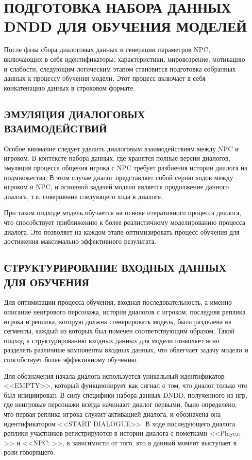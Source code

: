 \section{ПОДГОТОВКА НАБОРА ДАННЫХ DNDD ДЛЯ ОБУЧЕНИЯ МОДЕЛЕЙ}

После фазы сбора диалоговых данных и генерации параметров NPC, включающих в себя идентификаторы, характеристики, мировозрение, мотивацию и слабости, следующим логическим этапом становится подготовка собранных данных к процессу обучения модели. Этот процесс включает в себя конкатенацию данных в строковом формате.

\subsection{ЭМУЛЯЦИЯ ДИАЛОГОВЫХ ВЗАИМОДЕЙСТВИЙ}

Особое внимание следует уделить диалоговым взаимодействиям между NPC и игроком. В контексте набора данных, где хранятся полные версии диалогов, эмуляция процесса общения игрока с NPC требует разбиения истории диалога на подмножества. В этом случае диалог представляет собой серию ходов между игроком и NPC, и основной задачей модели является продолжение данного диалога, т.е. совершение следующего хода в диалоге.

При таком подходе модель обучается на основе итеративного процесса диалога, что способствует приближению к более реалистичному моделированию процесса диалога. Это позволяет на каждом этапе оптимизировать процесс обучения для достижения максимально эффективного результата.

\subsection{СТРУКТУРИРОВАНИЕ ВХОДНЫХ ДАННЫХ ДЛЯ ОБУЧЕНИЯ}

Для оптимизации процесса обучения, входная последовательность, а именно описание неигрового персонажа, история диалогов с игроком, последняя реплика игрока и реплика, которую должна сгенерировать модель, была разделена на сегменты, каждый из которых был помечен соответствующим образом. Такой подход к структурированию входных данных для модели позволяет ясно разделять различные компоненты входных данных, что облегчает задачу модели и способствует более эффективному обучению.

Для обозначения начала диалога используется уникальный идентификатор <<EMPTY>>, который функционирует как сигнал о том, что диалог только что был инициирован. В силу специфики набора данных DNDD, полученного из игр, где неигровые персонажи всегда начинают диалог первыми, было определено, что первая реплика игрока служит активацией диалога, и обозначена она идентификатором <<START DIALOGUE>>. В ходе последующего диалога реплики участников регистрируются в истории диалога с пометками <<Player: >> и <<NPC: >>, в зависимости от того, кто в данный момент выступает в роли говорящего.

